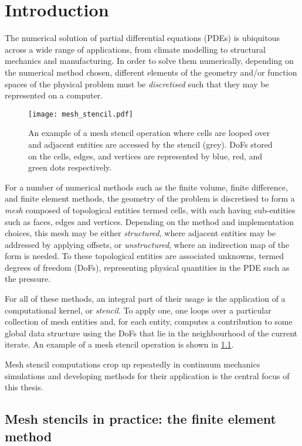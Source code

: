 \documentclass[thesis]{subfiles}
\begin{document}
\chapter{Introduction}
\label{chapter:introduction}

The numerical solution of partial differential equations (PDEs) is ubiquitous across a wide range of applications, from climate modelling to structural mechanics and manufacturing.
In order to solve them numerically, depending on the numerical method chosen, different elements of the geometry and/or function spaces of the physical problem must be \emph{discretised} such that they may be represented on a computer.

\begin{figure}
  \centering
  \texttt{[image: mesh\_stencil.pdf]}
  \caption{
    An example of a mesh stencil operation where cells are looped over and adjacent entities are accessed by the stencil (grey).
    DoFs stored on the cells, edges, and vertices are represented by blue, red, and green dots respectively.
  }
  \label{fig:mesh_stencil}
\end{figure}

For a number of numerical methods such as the finite volume, finite difference, and finite element methods, the geometry of the problem is discretised to form a \emph{mesh} composed of topological entities termed cells, with each having sub-entities such as faces, edges and vertices.
Depending on the method and implementation choices, this mesh may be either \textit{structured}, where adjacent entities may be addressed by applying offsets, or \textit{unstructured}, where an indirection map of the form  is needed.
To these topological entities are associated unknowns, termed degrees of freedom (DoFs), representing physical quantities in the PDE such as the pressure.

For all of these methods, an integral part of their usage is the application of a computational kernel, or \emph{stencil}.
To apply one, one loops over a particular collection of mesh entities and, for each entity, computes a contribution to some global data structure using the DoFs that lie in the neighbourhood of the current iterate.
An example of a mesh stencil operation is shown in \cref{fig:mesh_stencil}.

Mesh stencil computations crop up repeatedly in continuum mechanics simulations and developing methods for their application is the central focus of this thesis.

\section{Mesh stencils in practice: the finite element method}
\label{sec:stokes_equations}
\end{document}
